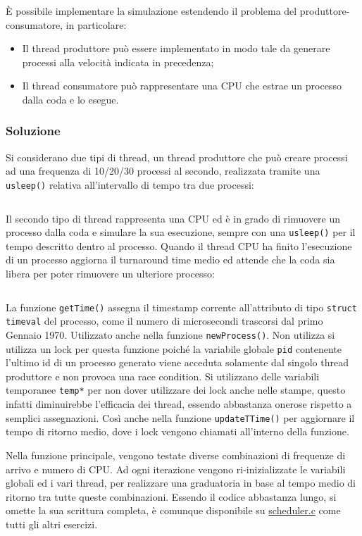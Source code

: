 \documentclass{article}
\numberwithin{equation}{subsection}
\begin{document}
\`{E} possibile implementare la simulazione estendendo il problema del produttore-consumatore, in particolare:
\begin{itemize}
    \item Il thread produttore può essere implementato in modo tale da generare processi alla velocità indicata in precedenza;
    \item Il thread consumatore può rappresentare una CPU che estrae un processo dalla coda e lo esegue.
\end{itemize}

\subsubsection*{Soluzione}

Si considerano due tipi di thread, un thread produttore che può creare processi ad una frequenza di 10/20/30 processi al secondo, realizzata tramite una \verb|usleep()| relativa all'intervallo di tempo tra due processi:
\inputminted[firstline=87, lastline=108, breaklines, breakanywhere]{c}{./Programmazione Concorrente/scheduler.c}
Il secondo tipo di thread rappresenta una CPU ed è in grado di rimuovere un processo dalla coda e simulare la sua esecuzione, sempre con una \verb|usleep()| per il tempo descritto dentro al processo. Quando il thread CPU ha finito l'esecuzione di un processo aggiorna il turnaround time medio ed attende che la coda sia libera per poter rimuovere un ulteriore processo:
\inputminted[firstline=110, lastline=138, breaklines, breakanywhere]{c}{./Programmazione Concorrente/scheduler.c}

La funzione \verb|getTime()| assegna il timestamp corrente all'attributo di tipo \verb|struct timeval| del processo, come il numero di microsecondi trascorsi dal primo Gennaio 1970. Utilizzato anche nella funzione \verb|newProcess()|. Non utilizza si utilizza un lock per questa funzione poiché la variabile globale \verb|pid| contenente l'ultimo id di un processo generato viene acceduta solamente dal singolo thread produttore e non provoca una race condition. 
Si utilizzano delle variabili temporanee \verb|temp*| per non dover utilizzare dei lock anche nelle stampe, questo infatti diminuirebbe l'efficacia dei thread, essendo abbastanza onerose rispetto a semplici assegnazioni. Così anche nella funzione \verb|updateTTime()| per aggiornare il tempo di ritorno medio, dove i lock vengono chiamati all'interno della funzione. 

Nella funzione principale, vengono testate diverse combinazioni di frequenze di arrivo e numero di CPU. Ad ogni iterazione vengono ri-inizializzate le variabili globali ed i vari thread, per realizzare una graduatoria in base al tempo medio di ritorno tra tutte queste combinazioni. Essendo il codice abbastanza lungo, si omette la sua scrittura completa, è comunque disponibile su \href{https://github.com/00Darxk/Sistemi-Operativi/tree/main/Esercizi/Programmazione%20Concorrente/scheduler.c}{scheduler.c} come tutti gli altri esercizi. 
\end{document}
